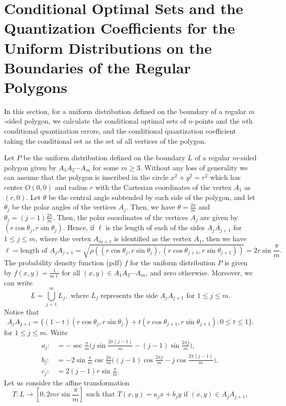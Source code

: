 \documentclass[12pt, reqno]{amsart}
\theoremstyle{plain}
\theoremstyle{definition}
\newcommand{\UU}{\bigcup}%
\newcommand{\set}[1]{\{#1\}}%
\newcommand{\gq}{\theta}
\newcommand{\te}{\text}%
\begin{document}
 \section{Conditional Optimal Sets and the Quantization Coefficients for the Uniform Distributions on the Boundaries of the Regular Polygons} \label{sec4} 
In this section, for a uniform distribution defined on the boundary of a regular $m$-sided polygon, we calculate the conditional optimal sets of $n$-points and the $n$th conditional quantization errors, and the conditional quantization coefficient taking the conditional set as the set of all vertices of the polygon. \par
Let $P$ be the uniform distribution defined on the boundary $L$ of a regular $m$-sided polygon given by $A_1A_2\cdots A_m$ for some $m\geq 3$. Without any loss of generality we can assume that the polygon is inscribed in the circle $x^2+y^2=r^2$ which has center $O(0, 0)$ and radius $r$ with the Cartesian coordinates of the vertex $A_1$ as $(r, 0)$. Let $\gq$ be the central angle subtended by each side of the polygon, and let $\gq_j$ be the polar angles of the vertices $A_j$. Then, we have $\gq=\frac {2\pi} m$ and $\gq_j=(j-1)\frac {2\pi} m$. Then, the polar coordinates of the vertices $A_j$ are given by $(r\cos \gq_j, r\sin \gq_j)$. Hence, if $\ell$ is the length of each of the sides $A_jA_{j+1}$ for $1\leq j\leq m$, where the vertex $A_{m+1}$ is identified as the vertex $A_1$, then we have  
\[\ell= \te{length of } A_j A_{j+1}=\sqrt{\rho((r\cos \gq_j, r\sin \gq_j), (r\cos \gq_{j+1}, r\sin \gq_{j+1}))}=2r\sin \frac{\pi}m.\]
The probability density function (pdf) $f$ for the uniform distribution $P$ is given by $f(x, y)=\frac 1{m\ell}$ for all $(x, y)\in A_1A_2\cdots A_m$, and zero otherwise. Moreover, we can write 
\[L=\UU_{j=1}^m L_j, \te{ where } L_j \te{ represents the side } A_jA_{j+1} \te{ for } 1\leq j\leq m.\]
Notice that 
\[A_jA_{j+1}=\set{(1-t)(r \cos \gq_j, r\sin \gq_j)+t(r\cos \gq_{j+1}, r\sin \gq_{j+1}) : 0\leq t\leq 1}.\] 
for $1\leq j\leq m$. Write 
\begin{align} a_j:&=-\sec \frac{\pi }{m} \Big(j \sin\frac{2 \pi  (j-1)}{m}-(j-1) \sin \frac{2 \pi  j}{m}\Big), \label{Me1}\\
b_j:&=-2 \sin \frac{\pi }{m} \csc \frac{2 \pi }{m} \Big((j-1) \cos \frac{2 \pi  j}{m}-j \cos\frac{2 \pi  (j-1)}{m}\Big), \label{Me2}\\
c_j:&=2 (j-1) r \sin \frac{\pi }{m}.\label{Me3}
\end{align} 
Let us consider the affine transformation  
\[T: L \to [0, 2mr\sin \frac{\pi} m]  \te{ such that } T(x, y)=a_j x +b_j y \te{ if }  (x, y) \in A_jA_{j+1},\]
\end{document}
